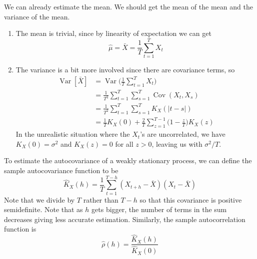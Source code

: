 \documentclass{article}
\DeclareMathOperator{\Cov}{Cov}
\DeclareMathOperator{\Var}{Var}
\begin{document}
      \begin{theorem}
        We can already estimate the mean. We should get the mean of the mean and the variance of the mean. 
        \begin{enumerate}
          \item The mean is trivial, since by linearity of expectation we can get 
            \begin{equation}
              \hat{\mu} = \bar{X} = \frac{1}{T} \sum_{t=1}^T X_t
            \end{equation}

          \item The variance is a bit more involved since there are covariance terms, so 
            \begin{align}
              \Var[\bar{X}] & = \Var \bigg( \frac{1}{T} \sum_{t=1}^T X_t \bigg) \\
                            & = \frac{1}{T^2} \sum_{t=1}^T \sum_{s=1}^T \Cov(X_t, X_s) \\
                            & = \frac{1}{T^2} \sum_{t=1}^T \sum_{s=1}^T K_X (|t - s|) \\
                            & = \frac{1}{T} K_X (0) + \frac{2}{T} \sum_{z=1}^{T-1} \Big(1 - \frac{z}{T} \Big) K_X (z)
            \end{align} 
            In the unrealistic situation where the $X_t$'s are uncorrelated, we have $K_X (0) = \sigma^2$ and $K_X (z) = 0$ for all $z > 0$, leaving us with $\sigma^2 / T$. 
        \end{enumerate}
      \end{theorem}

      \begin{theorem}
        To estimate the autocovariance of a weakly stationary process, we can define the sample autocovariance function to be
        \begin{equation}
          \hat{K}_X (h) = \frac{1}{T} \sum_{t=1}^{T-h} (X_{t+h} - \bar{X}) (X_t - \bar{X})
        \end{equation}
        Note that we divide by $T$ rather than $T - h$ so that this covariance is positive semidefinite. Note that as $h$ gets bigger, the number of terms in the sum decreases giving less accurate estimation. Similarly, the sample autocorrelation function is 
        \begin{equation}
          \hat{\rho} (h) = \frac{\hat{K}_X (h)}{\hat{K}_X (0)}
        \end{equation}
      \end{theorem}
\end{document}
